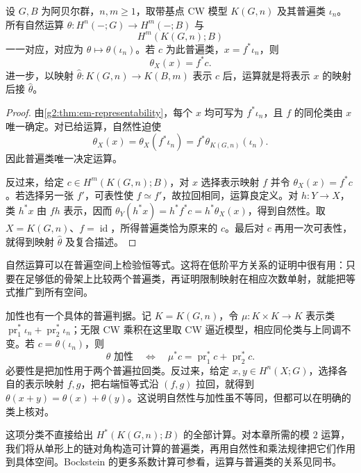\begin{theorem}\label{g2:thm:operations-representability}
	设 \(G,B\) 为阿贝尔群，\(n,m\ge1\)，取带基点 CW 模型 \(K(G,n)\) 及其普遍类 \(\iota_n\)。所有自然运算 \(\theta:H^n(-;G)\to H^m(-;B)\) 与
	\[
		H^m(K(G,n);B)
	\]
	一一对应，对应为 \(\theta\mapsto\theta(\iota_n)\)。若 \(c\) 为此普遍类，\(x=f^*\iota_n\)，则
	\[
		\theta_X(x)=f^*c.
	\]
	进一步，以映射 \(\widehat\theta:K(G,n)\to K(B,m)\) 表示 \(c\) 后，运算就是将表示 \(x\) 的映射后接 \(\widehat\theta\)。
\end{theorem}
\begin{proof}
	由\cref{g2:thm:em-representability}，每个 \(x\) 均可写为 \(f^*\iota_n\)，且 \(f\) 的同伦类由 \(x\) 唯一确定。对已给运算，自然性迫使
	\[
		\theta_X(x)=\theta_X(f^*\iota_n)=f^*\theta_{K(G,n)}(\iota_n).
	\]
	因此普遍类唯一决定运算。

	反过来，给定 \(c\in H^m(K(G,n);B)\)，对 \(x\) 选择表示映射 \(f\) 并令 \(\theta_X(x)=f^*c\)。若选择另一张 \(f'\)，可表性使 \(f\simeq f'\)，故拉回相同，运算良定义。对 \(h:Y\to X\)，类 \(h^*x\) 由 \(fh\) 表示，因而 \(\theta_Y(h^*x)=h^*f^*c=h^*\theta_X(x)\)，得到自然性。取 \(X=K(G,n)\)、\(f=\operatorname{id}\)，所得普遍类恰为原来的 \(c\)。最后对 \(c\) 再用一次可表性，就得到映射 \(\widehat\theta\) 及复合描述。
\end{proof}

自然运算可以在普遍空间上检验恒等式。这将在低阶平方关系的证明中很有用：只要在足够低的骨架上比较两个普遍类，再证明限制映射在相应次数单射，就能把等式推广到所有空间。

\ProseParagraphBreak

加性也有一个具体的普遍判据。记 \(K=K(G,n)\)，令 \(\mu:K\times K\to K\) 表示类 \(\operatorname{pr}_1^*\iota_n+\operatorname{pr}_2^*\iota_n\)；无限 CW 乘积在这里取 CW 逼近模型，相应同伦类与上同调不变。若 \(c=\theta(\iota_n)\)，则
\begin{equation}\label{g2:eq:operation-primitive-criterion}
	\theta\text{ 加性}\quad\Longleftrightarrow\quad\mu^*c=\operatorname{pr}_1^*c+\operatorname{pr}_2^*c.
\end{equation}
必要性是把加性用于两个普遍拉回类。反过来，给定 \(x,y\in H^n(X;G)\)，选择各自的表示映射 \(f,g\)，把右端恒等式沿 \((f,g)\) 拉回，就得到 \(\theta(x+y)=\theta(x)+\theta(y)\)。这说明自然性与加性虽不等同，但都可以在明确的类上核对。

\ProseParagraphBreak

这项分类不直接给出 \(H^*(K(G,n);B)\) 的全部计算。对本章所需的模 \(2\) 运算，我们将从单形上的链对角构造可计算的普遍类，再用自然性和乘法规律把它们作用到具体空间。Bockstein 的更多系数计算可参看\cite[第3.E节]{Hatcher2002}，运算与普遍类的关系见同书\cite[第4.L节，Steenrod Squares and Powers]{Hatcher2002}。
